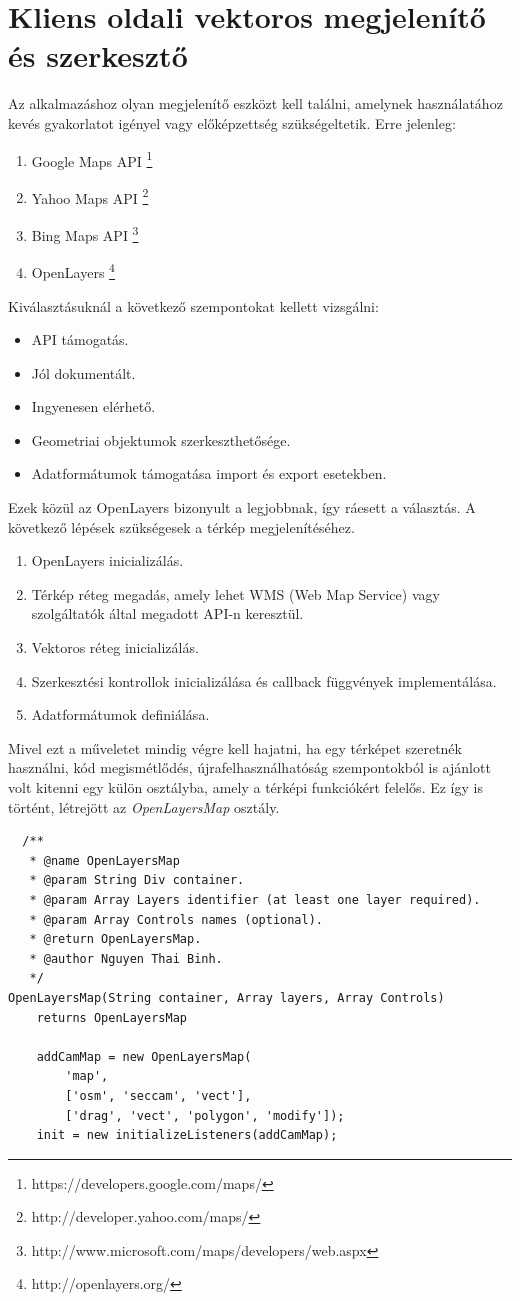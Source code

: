 \section{Kliens oldali vektoros megjelenítő és szerkesztő} %
\label{sec:gis_kiegészítő}
Az alkalmazáshoz  olyan megjelenítő eszközt kell találni, amelynek használatához kevés gyakorlatot igényel vagy előképzettség szükségeltetik.
Erre jelenleg:
\begin{enumerate}
  \item Google Maps API \footnote{https://developers.google.com/maps/}
  \item Yahoo Maps API \footnote{http://developer.yahoo.com/maps/}
  \item Bing Maps API \footnote{http://www.microsoft.com/maps/developers/web.aspx}
  \item OpenLayers \footnote{http://openlayers.org/}
\end{enumerate}
Kiválasztásuknál a következő szempontokat kellett vizsgálni:
\begin{itemize}
  \item API támogatás.
  \item Jól dokumentált.
  \item Ingyenesen elérhető.
  \item Geometriai objektumok szerkeszthetősége.
  \item Adatformátumok támogatása import és export esetekben.
\end{itemize}
Ezek közül az OpenLayers bizonyult a legjobbnak, így ráesett a választás. A következő lépések szükségesek a térkép megjelenítéséhez.
\begin{enumerate}
  \item OpenLayers inicializálás.
  \item Térkép réteg megadás, amely lehet WMS (Web Map Service) vagy szolgáltatók által megadott API-n keresztül.
  \item Vektoros réteg inicializálás.
  \item Szerkesztési kontrollok inicializálása és callback függvények implementálása.
  \item Adatformátumok definiálása.
\end{enumerate}
Mivel ezt a műveletet mindig végre kell hajatni, ha egy térképet szeretnék használni, kód megismétlődés, újrafelhasználhatóság szempontokból is ajánlott volt kitenni egy külön osztályba, amely a térképi funkciókért felelős. Ez így is történt, létrejött az \emph{OpenLayersMap} osztály.
\begin{verbatim}
  /**
   * @name OpenLayersMap
   * @param String Div container.
   * @param Array Layers identifier (at least one layer required).
   * @param Array Controls names (optional).
   * @return OpenLayersMap.
   * @author Nguyen Thai Binh.
   */
OpenLayersMap(String container, Array layers, Array Controls) 
    returns OpenLayersMap

    addCamMap = new OpenLayersMap(
        'map', 
        ['osm', 'seccam', 'vect'], 
        ['drag', 'vect', 'polygon', 'modify']);
    init = new initializeListeners(addCamMap);
\end{verbatim}

